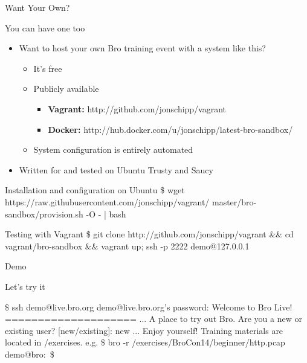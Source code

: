 \documentclass[xcolor=svgnames,handout]{beamer}
\begin{document}
\begin{frame}{Want Your Own?}
  \begin{block}{You can have one too}
    \begin{itemize}
      \item Want to host your own Bro training event with a system like this?
    	\begin{itemize}
		\item It's free
		\item Publicly available
		\begin{itemize}
			\item \textbf{Vagrant:} http://github.com/jonschipp/vagrant
			\item \textbf{Docker:} http://hub.docker.com/u/jonschipp/latest-bro-sandbox/
		\end{itemize}
		\item System configuration is entirely automated
	\end{itemize}
	\item Written for and tested on Ubuntu Trusty and Saucy
    \end{itemize}
  \end{block}
  \begin{exampleblock}{Installation and configuration on Ubuntu}
	\alert{\$ wget https://raw.githubusercontent.com/jonschipp/vagrant/
	master/bro-sandbox/provision.sh -O - | bash}
  \end{exampleblock}
  \begin{exampleblock}{Testing with Vagrant}
	\alert{\$ git clone http://github.com/jonschipp/vagrant \&\& cd vagrant/bro-sandbox \&\& vagrant up; ssh -p 2222 demo@127.0.0.1}
  \end{exampleblock}
\end{frame}

\begin{frame}{Demo}
  \begin{exampleblock}{Let's try it}
\begin{semiverbatim}
\$ ssh demo@live.bro.org \newline
demo@live.bro.org's password:  \newline
Welcome to Bro Live! \newline
==================== \newline
... 		     \newline
A place to try out Bro. \newline
Are you a new or existing user? [new/existing]: new \newline
... \newline
Enjoy yourself! \newline
Training materials are located in /exercises. \newline
e.g. \$ bro -r /exercises/BroCon14/beginner/http.pcap \newline
demo@bro:~\$
\end{semiverbatim}
  \end{exampleblock}
\end{frame}
\end{document}
